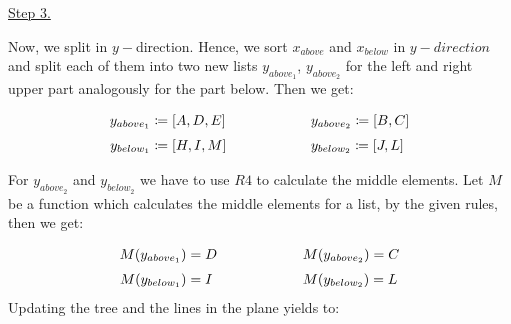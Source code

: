 \documentclass[english, fontsize=12pt, paper=a4, twoside=false, draft=true, pagesize=auto, version=last, DIV=16]{scrartcl}
\theoremstyle{break}
\begin{document}
\underline{Step 3.} \par
Now, we split in $y-$direction. Hence, we sort $x_{above}$ and $x_{below}$ in $y-direction$ and split each of them into two new lists $y_{above_1}$, $y_{above_2}$ for the left and right upper part analogously for the part below. Then we get: \par
\vspace*{-3mm}
\begin{equation}
\begin{aligned}
y_{above_1} & \coloneqq [A,D,E] \hspace*{18mm} && y_{above_2} \coloneqq [B,C] \\[3pt]
y_{below_1} & \coloneqq [H,I,M] && y_{below_2} \coloneqq [J,L]
\end{aligned}
\end{equation} \par
For $y_{above_2}$ and $y_{below_2}$ we have to use $R4$ to calculate the middle elements. Let $M$ be a function which calculates the middle elements for a list, by the given rules, then we get: \par
\begin{equation}
\begin{aligned}
M(y_{above_1}) & = D \hspace*{18mm} && M(y_{above_2}) = C \\[3pt]
M(y_{below_1}) & = I && M(y_{below_2}) = L
\end{aligned}
\end{equation}
Updating the tree and the lines in the plane yields to: \par
\vspace*{-5mm}
\end{document}
